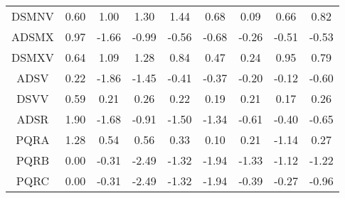 \begin{longtable}{ | c || c | c | c | c | c | c | c || c |}
DSMNV &  \cellcolor[HTML]{EFEFFF} 0.60 &  \cellcolor[HTML]{E7E7FF} 1.00 &  \cellcolor[HTML]{DFDFFF} 1.30 &  \cellcolor[HTML]{D7D7FF} 1.44 &  \cellcolor[HTML]{EFEFFF} 0.68 &  \cellcolor[HTML]{FFFFFF} 0.09 &  \cellcolor[HTML]{EFEFFF} 0.66 &  \cellcolor[HTML]{E7E7FF} 0.82 \\
ADSMX &  \cellcolor[HTML]{E7E7FF} 0.97 &  \cellcolor[HTML]{FFD7D7} -1.66 &  \cellcolor[HTML]{FFE7E7} -0.99 &  \cellcolor[HTML]{FFEFEF} -0.56 &  \cellcolor[HTML]{FFEFEF} -0.68 &  \cellcolor[HTML]{FFF7F7} -0.26 &  \cellcolor[HTML]{FFEFEF} -0.51 &  \cellcolor[HTML]{FFEFEF} -0.53 \\
DSMXV &  \cellcolor[HTML]{EFEFFF} 0.64 &  \cellcolor[HTML]{E7E7FF} 1.09 &  \cellcolor[HTML]{DFDFFF} 1.28 &  \cellcolor[HTML]{E7E7FF} 0.84 &  \cellcolor[HTML]{F7F7FF} 0.47 &  \cellcolor[HTML]{F7F7FF} 0.24 &  \cellcolor[HTML]{E7E7FF} 0.95 &  \cellcolor[HTML]{EFEFFF} 0.79 \\
ADSV &  \cellcolor[HTML]{F7F7FF} 0.22 &  \cellcolor[HTML]{FFCFCF} -1.86 &  \cellcolor[HTML]{FFD7D7} -1.45 &  \cellcolor[HTML]{FFF7F7} -0.41 &  \cellcolor[HTML]{FFF7F7} -0.37 &  \cellcolor[HTML]{FFF7F7} -0.20 &  \cellcolor[HTML]{FFFFFF} -0.12 &  \cellcolor[HTML]{FFEFEF} -0.60 \\
DSVV &  \cellcolor[HTML]{EFEFFF} 0.59 &  \cellcolor[HTML]{F7F7FF} 0.21 &  \cellcolor[HTML]{F7F7FF} 0.26 &  \cellcolor[HTML]{F7F7FF} 0.22 &  \cellcolor[HTML]{F7F7FF} 0.19 &  \cellcolor[HTML]{F7F7FF} 0.21 &  \cellcolor[HTML]{F7F7FF} 0.17 &  \cellcolor[HTML]{F7F7FF} 0.26 \\
ADSR &  \cellcolor[HTML]{CFCFFF} 1.90 &  \cellcolor[HTML]{FFD7D7} -1.68 &  \cellcolor[HTML]{FFE7E7} -0.91 &  \cellcolor[HTML]{FFD7D7} -1.50 &  \cellcolor[HTML]{FFDFDF} -1.34 &  \cellcolor[HTML]{FFEFEF} -0.61 &  \cellcolor[HTML]{FFF7F7} -0.40 &  \cellcolor[HTML]{FFEFEF} -0.65 \\
PQRA &  \cellcolor[HTML]{DFDFFF} 1.28 &  \cellcolor[HTML]{EFEFFF} 0.54 &  \cellcolor[HTML]{EFEFFF} 0.56 &  \cellcolor[HTML]{F7F7FF} 0.33 &  \cellcolor[HTML]{FFFFFF} 0.10 &  \cellcolor[HTML]{F7F7FF} 0.21 &  \cellcolor[HTML]{FFDFDF} -1.14 &  \cellcolor[HTML]{F7F7FF} 0.27 \\
PQRB &  \cellcolor[HTML]{FFFFFF} 0.00 &  \cellcolor[HTML]{FFF7F7} -0.31 &  \cellcolor[HTML]{FFBFBF} -2.49 &  \cellcolor[HTML]{FFDFDF} -1.32 &  \cellcolor[HTML]{FFCFCF} -1.94 &  \cellcolor[HTML]{FFDFDF} -1.33 &  \cellcolor[HTML]{FFDFDF} -1.12 &  \cellcolor[HTML]{FFDFDF} -1.22 \\
PQRC &  \cellcolor[HTML]{FFFFFF} 0.00 &  \cellcolor[HTML]{FFF7F7} -0.31 &  \cellcolor[HTML]{FFBFBF} -2.49 &  \cellcolor[HTML]{FFDFDF} -1.32 &  \cellcolor[HTML]{FFCFCF} -1.94 &  \cellcolor[HTML]{FFF7F7} -0.39 &  \cellcolor[HTML]{FFF7F7} -0.27 &  \cellcolor[HTML]{FFE7E7} -0.96 \\

\end{longtable}
